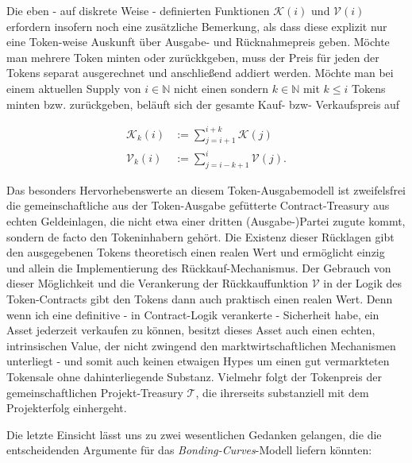 Die eben - auf diskrete Weise - definierten Funktionen $\mathcal{K} \left( i \right)$ und $\mathcal{V} \left( i \right)$ erfordern insofern noch eine zusätzliche Bemerkung, als dass diese explizit nur eine Token-weise Auskunft über Ausgabe- und Rücknahmepreis geben. Möchte man mehrere Token minten oder zurückkgeben, muss der Preis für jeden der Tokens separat ausgerechnet und anschließend addiert werden. Möchte man bei einem aktuellen Supply von $i \in \mathbb{N}$ nicht einen sondern $k \in \mathbb{N}$ mit $k \leq i$ Tokens minten bzw. zurückgeben, beläuft sich der gesamte Kauf- bzw- Verkaufspreis auf

\begin{align*}
\mathcal{K}_{k} \left( i \right) &:= \sum_{j = i + 1}^{i + k} \mathcal{K} \left( j \right) \\
\mathcal{V}_{k} \left( i \right) &:= \sum_{j = i - k + 1}^{i} \mathcal{V} \left( j \right).
\end{align*}

\vspace{0.3cm}

Das besonders Hervorhebenswerte an diesem Token-Ausgabemodell ist zweifelsfrei die gemeinschaftliche aus der Token-Ausgabe gefütterte Contract-Treasury aus echten Geldeinlagen, die nicht etwa einer dritten (Ausgabe-)Partei zugute kommt, sondern de facto den Tokeninhabern gehört. Die Existenz dieser Rücklagen gibt den ausgegebenen Tokens theoretisch einen realen Wert und ermöglicht einzig und allein die Implementierung des Rückkauf-Mechanismus. Der Gebrauch von dieser Möglichkeit und die Verankerung der Rückkauffunktion $\mathbf{\mathcal{V}}$ in der Logik des Token-Contracts gibt den Tokens dann auch praktisch einen realen Wert. Denn wenn ich eine definitive - in Contract-Logik verankerte - Sicherheit habe, ein Asset jederzeit verkaufen zu können, besitzt dieses Asset auch einen echten, intrinsischen Value, der nicht zwingend den marktwirtschaftlichen Mechanismen unterliegt - und somit auch keinen etwaigen Hypes um einen gut vermarkteten Tokensale ohne dahinterliegende Substanz. Vielmehr folgt der Tokenpreis der gemeinschaftlichen Projekt-Treasury $\mathbf{\mathcal{T}}$, die ihrerseits substanziell mit dem Projekterfolg einhergeht. 

\vspace{0.2cm}

Die letzte Einsicht lässt uns zu zwei wesentlichen Gedanken gelangen, die die entscheidenden Argumente für das \textit{Bonding-Curves}-Modell liefern könnten:

